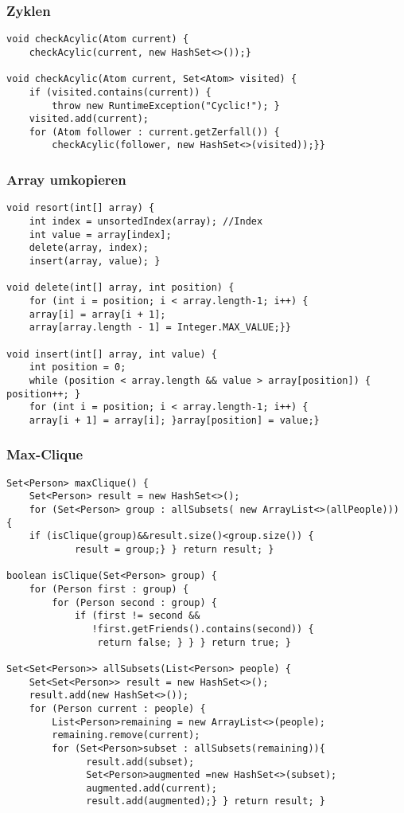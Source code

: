 \begin{multicols*}{5}
	\subsubsection{Zyklen}
		\begin{lstlisting}
void checkAcylic(Atom current) {
	checkAcylic(current, new HashSet<>());}
			
void checkAcylic(Atom current, Set<Atom> visited) {
	if (visited.contains(current)) {
		throw new RuntimeException("Cyclic!"); }
	visited.add(current);
	for (Atom follower : current.getZerfall()) {
		checkAcylic(follower, new HashSet<>(visited));}}
		\end{lstlisting}
	\subsubsection{Array umkopieren}
	\begin{lstlisting}
void resort(int[] array) {
	int index = unsortedIndex(array); //Index
	int value = array[index]; 
	delete(array, index); 
	insert(array, value); }

void delete(int[] array, int position) {
	for (int i = position; i < array.length-1; i++) {
	array[i] = array[i + 1]; 
	array[array.length - 1] = Integer.MAX_VALUE;}}

void insert(int[] array, int value) { 
	int position = 0;
	while (position < array.length && value > array[position]) { position++; }
	for (int i = position; i < array.length-1; i++) {
	array[i + 1] = array[i]; }array[position] = value;}
	\end{lstlisting}
	\subsubsection{Max-Clique}
		\begin{lstlisting}
Set<Person> maxClique() {
	Set<Person> result = new HashSet<>();
	for (Set<Person> group : allSubsets( new ArrayList<>(allPeople))) {
	if (isClique(group)&&result.size()<group.size()) {
			result = group;} } return result; }

boolean isClique(Set<Person> group) { 
	for (Person first : group) {
		for (Person second : group) {
			if (first != second && 
			   !first.getFriends().contains(second)) {
				return false; } } } return true; }

Set<Set<Person>> allSubsets(List<Person> people) { 
	Set<Set<Person>> result = new HashSet<>(); 
	result.add(new HashSet<>());
	for (Person current : people) {
		List<Person>remaining = new ArrayList<>(people); 
		remaining.remove(current);
		for (Set<Person>subset : allSubsets(remaining)){
			  result.add(subset);
			  Set<Person>augmented =new HashSet<>(subset); 
			  augmented.add(current); 
			  result.add(augmented);} } return result; }


\end{lstlisting}
\end{multicols*}
